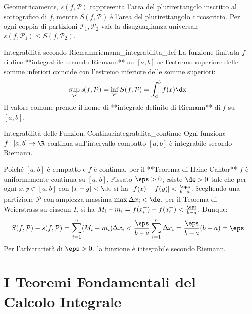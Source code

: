 Geometricamente, $s(f, \mathcal{P})$ rappresenta l'area del plurirettangolo inscritto al sottografico di $f$, mentre $S(f, \mathcal{P})$ è l'area del plurirettangolo circoscritto. Per ogni coppia di partizioni $\mathcal{P}_1, \mathcal{P}_2$ vale la disuguaglianza universale $s(f, \mathcal{P}_1) \le S(f, \mathcal{P}_2)$.

\begin{definizione}{Integrabilità secondo Riemann}{riemann_integrabilita_def}
La funzione limitata $f$ si dice **integrabile secondo Riemann** su $[a, b]$ se l'estremo superiore delle somme inferiori coincide con l'estremo inferiore delle somme superiori:
\[
    \sup_{\mathcal{P}} s(f, \mathcal{P}) = \inf_{\mathcal{P}} S(f, \mathcal{P}) = \int_a^b f(x) \dx
\]
Il valore comune prende il nome di **integrale definito di Riemann** di $f$ su $[a, b]$.
\end{definizione}

\begin{teorema}{Integrabilità delle Funzioni Continue}{integrabilita_continue}
Ogni funzione $f \colon [a, b] \to \R$ continua sull'intervallo compatto $[a, b]$ è integrabile secondo Riemann.
\end{teorema}

\begin{dimostrazione}
Poiché $[a, b]$ è compatto e $f$ è continua, per il **Teorema di Heine-Cantor** $f$ è uniformemente continua su $[a, b]$.
Fissato $\eps > 0$, esiste $\de > 0$ tale che per ogni $x, y \in [a, b]$ con $|x - y| < \de$ si ha $|f(x) - f(y)| < \frac{\eps}{b - a}$.
Scegliendo una partizione $\mathcal{P}$ con ampiezza massima $\max \Delta x_i < \de$, per il Teorema di Weierstrass su ciascun $I_i$ si ha $M_i - m_i = f(x_i^+) - f(x_i^-) < \frac{\eps}{b - a}$. Dunque:
\[
    S(f, \mathcal{P}) - s(f, \mathcal{P}) = \sum_{i=1}^n (M_i - m_i)\Delta x_i < \frac{\eps}{b - a} \sum_{i=1}^n \Delta x_i = \frac{\eps}{b - a}(b - a) = \eps
\]
Per l'arbitrarietà di $\eps > 0$, la funzione è integrabile secondo Riemann.
\end{dimostrazione}

\section{I Teoremi Fondamentali del Calcolo Integrale}
\label{sec:teoremi_fondamentali_integrali}


